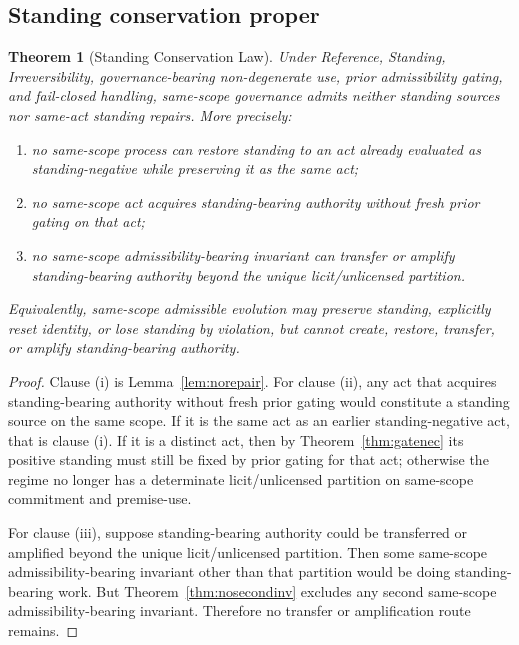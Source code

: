 \documentclass[11pt]{article}
\newtheorem{theorem}{Theorem}[section]
\begin{document}
\subsection{Standing conservation proper}

\begin{theorem}[Standing Conservation Law]
\label{thm:conservation}
Under Reference, Standing, Irreversibility, governance-bearing non-degenerate use, prior admissibility gating, and fail-closed handling, same-scope governance admits neither standing sources nor same-act standing repairs. More precisely:
\begin{enumerate}
\item[(i)] no same-scope process can restore standing to an act already evaluated as standing-negative while preserving it as the same act;
\item[(ii)] no same-scope act acquires standing-bearing authority without fresh prior gating on that act;
\item[(iii)] no same-scope admissibility-bearing invariant can transfer or amplify standing-bearing authority beyond the unique licit/unlicensed partition.
\end{enumerate}
Equivalently, same-scope admissible evolution may preserve standing, explicitly reset identity, or lose standing by violation, but cannot create, restore, transfer, or amplify standing-bearing authority.
\end{theorem}

\begin{proof}
Clause (i) is Lemma~\ref{lem:norepair}. For clause (ii), any act that acquires standing-bearing authority without fresh prior gating would constitute a standing source on the same scope. If it is the same act as an earlier standing-negative act, that is clause (i). If it is a distinct act, then by Theorem~\ref{thm:gatenec} its positive standing must still be fixed by prior gating for that act; otherwise the regime no longer has a determinate licit/unlicensed partition on same-scope commitment and premise-use.

For clause (iii), suppose standing-bearing authority could be transferred or amplified beyond the unique licit/unlicensed partition. Then some same-scope admissibility-bearing invariant other than that partition would be doing standing-bearing work. But Theorem~\ref{thm:nosecondinv} excludes any second same-scope admissibility-bearing invariant. Therefore no transfer or amplification route remains.
\end{proof}
\end{document}
